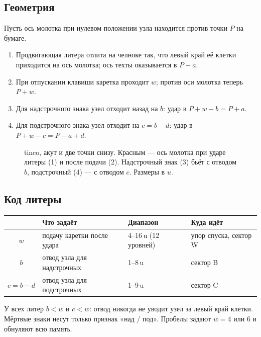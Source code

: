 \subsection{Геометрия}

Пусть ось молотка при нулевом положении узла находится против точки $P$ на бумаге.

\begin{enumerate}
  \item Продвигающая литера отлита на челноке так, что левый край её клетки приходится на ось молотка; ось техты оказывается в $P + a$.
  \item При отпускании клавиши каретка проходит $w$; против оси молотка теперь $P + w$.
  \item Для надстрочного знака узел отходит назад на $b$: удар в $P + w - b = P + a$.
  \item Для подстрочного знака узел отходит на $c = b - d$: удар в $P + w - c = P + a + d$.
\end{enumerate}

\begin{figure}[h]
\centering
\setlength\tgem{48mm}
\begin{tikzpicture}[x=\tgu,y=\tgu]

\end{tikzpicture}
\caption{tinco, акут и две точки снизу. Красным — ось молотка при ударе литеры (1) и после подачи (2). Надстрочный знак (3) бьёт с отводом $b$, подстрочный (4) — с отводом $c$. Размеры в $u$.}
\label{fig:geom}
\end{figure}

\subsection{Код литеры}

\begin{center}\small
\begin{tabular}{@{}clll@{}}
\toprule
& Что задаёт & Диапазон & Куда идёт \\
\midrule
$w$ & подачу каретки после удара & 4--16\,u (12 уровней) & упор спуска, сектор W \\
$b$ & отвод узла для надстрочных & 1--8\,u & сектор B \\
$c = b - d$ & отвод узла для подстрочных & 1--9\,u & сектор C \\
\bottomrule
\end{tabular}
\end{center}

У всех литер $b < w$ и $c < w$: отвод никогда не уводит узел за левый край клетки. Мёртвые знаки несут только признак «над / под». Пробелы задают $w = 4$ или $6$ и обнуляют всю память.

